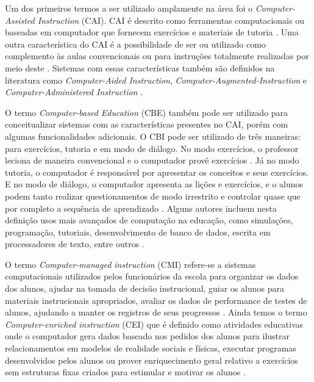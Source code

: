 Um dos primeiros termos a ser utilizado amplamente na área foi o \emph{Computer-Assisted Instruction} (CAI). CAI é descrito como ferramentas computacionais ou baseadas em computador que fornecem exercícios e materiais de tutoria \cite{wheres98}. Uma outra característica do CAI é a possibilidade de ser ou utilizado como complemento às aulas convencionais ou para instruções totalmente realizadas por meio deste \cite{cotton91}. Sistemas com essas características também são definidos na literatura como \emph{Computer-Aided Instruction}, \emph{Computer-Augmented-Instruction} e \emph{Computer-Administered Instruction} \cite{effectiveness85}.

O termo \emph{Computer-based Education} (CBE) também pode ser utilizado para conceitualizar sistemas com as características presentes no CAI, porém com algumas funcionalidades adicionais. O CBI pode ser utilizado de três maneiras: para exercícios, tutoria e em modo de diálogo. No modo exercícios, o  professor leciona de maneira convencional e o computador provê exercícios \cite{wheres98}. Já no modo tutoria, o computador é responsável por apresentar os conceitos e seus exercícios. E no modo de diálogo, o computador apresenta as lições e exercícios, e o alunos podem tanto realizar questionamentos de modo irrestrito e controlar quase que por completo a sequência de aprendizado \cite{wheres98}. Alguns autores incluem nesta definição usos mais avançados de computação na educação, como simulações, programação, tutoriais, desenvolvimento de banco de dados, escrita em processadores de texto, entre outros \cite{cotton91}.


O termo \emph{Computer-managed instruction} (CMI) refere-se a sistemas computacionais utilizados pelos funcionários da escola para organizar os dados dos alunos, ajudar na tomada de decisão instrucional, guiar os alunos para materiais instrucionais apropriados, avaliar os dados de performance de testes de alunos, ajudando a manter os registros de seus progressos \cite{cotton91, wheres98}. Ainda temos o termo \emph{Computer-enriched instruction} (CEI) que é definido como atividades educativas onde o computador gera dados baseado nos pedidos dos alunos para ilustrar relacionamentos em modelos de realidade sociais e físicas, executar programas desenvolvidos pelos alunos ou prover enriquecimento geral relativo a exercícios sem estruturas fixas criados para estimular e motivar os alunos \cite{cotton91}.

